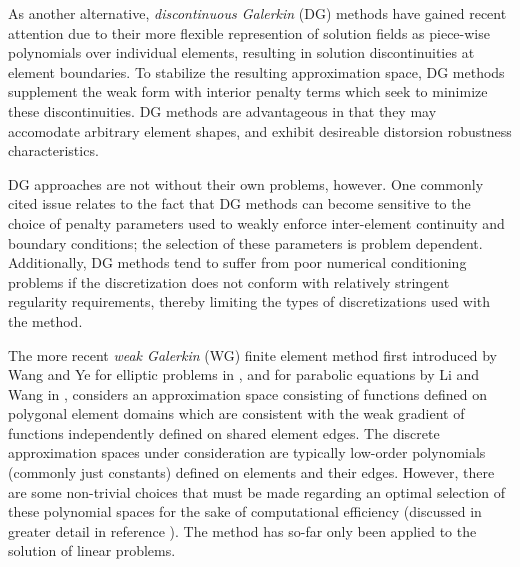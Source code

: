 		As another alternative, \textit{discontinuous Galerkin} (DG) methods have gained recent attention due to their more flexible represention of solution fields as piece-wise polynomials over individual elements, resulting in solution discontinuities at element boundaries. To stabilize the resulting approximation space, DG methods supplement the weak form with interior penalty terms which seek to minimize these discontinuities. DG methods are advantageous in that they may accomodate arbitrary element shapes, and exhibit desireable distorsion robustness characteristics.
		
		DG approaches are not without their own problems, however. One commonly cited issue relates to the fact that DG methods can become sensitive to the choice of penalty parameters used to weakly enforce inter-element continuity and boundary conditions; the selection of these parameters is problem dependent. Additionally, DG methods tend to suffer from poor numerical conditioning problems if the discretization does not conform with relatively stringent regularity requirements, thereby limiting the types of discretizations used with the method.
			
		The more recent \textit{weak Galerkin} (WG) finite element method first introduced by Wang and Ye for elliptic problems in \cite{Wang:13}, and for parabolic equations by Li and Wang in \cite{Li:13}, considers an approximation space consisting of functions defined on polygonal element domains which are consistent with the weak gradient of functions independently defined on shared element edges. The discrete approximation spaces under consideration are typically low-order polynomials (commonly just constants) defined on elements and their edges. However, there are some non-trivial choices that must be made regarding an optimal selection of these polynomial spaces for the sake of computational efficiency (discussed in greater detail in reference \cite{Mu:15:1}). The method has so-far only been applied to the solution of linear problems.

